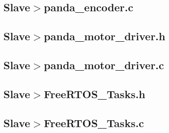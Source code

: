 \documentclass{article}
\begin{document}
    \subsection{Slave$>$panda\_encoder.c}

    \subsection{Slave$>$panda\_motor\_driver.h}
    \subsection{Slave$>$panda\_motor\_driver.c}

    \subsection{Slave$>$FreeRTOS\_Tasks.h}
    \subsection{Slave$>$FreeRTOS\_Tasks.c}

\end{document}
